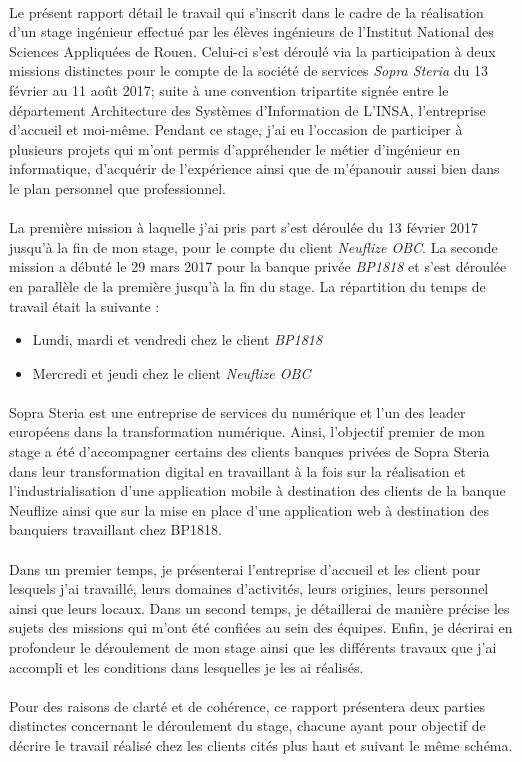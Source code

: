 \paragraph{}
Le présent rapport détail le travail qui s’inscrit dans le cadre de la réalisation d’un stage ingénieur effectué par les élèves ingénieurs de l’Institut National des Sciences Appliquées de Rouen. Celui-ci s’est déroulé via la participation à deux missions distinctes pour le compte de la société de services \textit{Sopra Steria} du 13 février au 11 août 2017; suite à une convention tripartite signée entre le département Architecture des Systèmes d’Information de L’INSA, l’entreprise d’accueil et moi-même. Pendant ce stage, j’ai eu l’occasion de participer à plusieurs projets qui m’ont permis d’appréhender le métier d’ingénieur en informatique, d’acquérir de l’expérience ainsi que de m’épanouir aussi bien dans le plan personnel que professionnel.

\paragraph{}
La première mission à laquelle j'ai pris part s'est déroulée du 13 février 2017 jusqu'à la fin de mon stage, pour le compte du client \textit{Neuflize OBC}. La seconde mission a débuté le 29 mars 2017 pour la banque privée \textit{BP1818} et s'est déroulée en parallèle de la première jusqu'à la fin du stage. La répartition du temps de travail était la suivante :
\begin{itemize}
	\item Lundi, mardi et vendredi chez le client \textit{BP1818}
	\item Mercredi et jeudi chez le client \textit{Neuflize OBC}
\end{itemize}

\paragraph{}
Sopra Steria est une entreprise de services du numérique et l'un des leader européens dans la transformation numérique. Ainsi, l'objectif premier de mon stage a été d'accompagner certains des clients banques privées de Sopra Steria dans leur transformation digital en travaillant à la fois sur la réalisation et l'industrialisation d'une application mobile à destination des clients de la banque Neuflize ainsi que sur la mise en place d'une application web à destination des banquiers travaillant chez BP1818.

\paragraph{}
Dans un premier temps, je présenterai l'entreprise d'accueil et les client pour lesquels j'ai travaillé, leurs domaines d’activités, leurs origines, leurs personnel ainsi que leurs locaux.
Dans un second temps, je détaillerai de manière précise les sujets des missions qui m’ont été confiées au sein des équipes.
Enfin, je décrirai en profondeur le déroulement de mon stage ainsi que les différents travaux que j’ai accompli et les conditions dans lesquelles je les ai réalisés. 

\paragraph{}
Pour des raisons de clarté et de cohérence, ce rapport présentera deux parties distinctes concernant le déroulement du stage, chacune ayant pour objectif de décrire le travail réalisé chez les clients cités plus haut et suivant le même schéma.